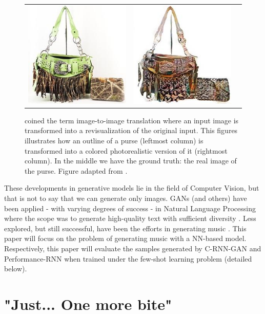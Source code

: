 \documentclass[a4paper]{book}
\begin{document}
\begin{figure}[t]
\begin{tabular}{ccc}
    \includegraphics[width=.15\linewidth]{images/handbags_edges_lotsofresults_latex/gt_130_AB.jpg} &
    \includegraphics[width=.15\linewidth]{images/handbags_edges_lotsofresults_latex/L1cGAN_130_AB.jpg} \\
    \end{tabular}
    \caption{\textcite{isola_image--image_2016} coined the term image-to-image translation where an input image is transformed into a revisualization of the original input. This figures illustrates how an outline of a purse (leftmost column) is transformed into a colored photorealistic version of it (rightmost column). In the middle we have the ground truth: the real image of the purse. Figure adapted from \textcite{isola_image--image_2016}.}
    \label{fig:pix2pix}
\end{figure}

These developments in generative models lie in the field of Computer Vision, but that is not to say that we can generate only images. GANs (and others) have been applied - with varying degrees of success - in Natural Language Processing where the scope was to generate high-quality text with sufficient diversity \parencite[e.g.,][]{yu_seqgan_2016, chen_adversarial_2018}. Less explored, but still successful, have been the efforts in generating music \parencite[e.g.,][]{mogren_c-rnn-gan_2016, dong_musegan_2017}. This paper will focus on the problem of generating music with a NN-based model. Respectively, this paper will evaluate the samples generated by C-RNN-GAN \parencite{mogren_c-rnn-gan_2016} and Performance-RNN \parencite{oore_this_2018} when trained under the few-shot learning problem (detailed below).

\section{"Just... One more bite"}\label{sec:hungry}
\end{document}
